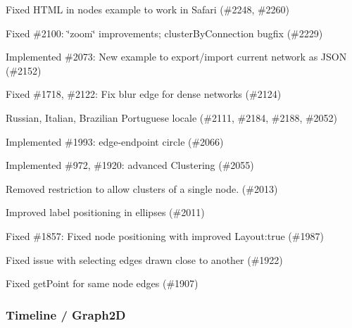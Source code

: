\begin{DoxyItemize}
\item Fixed H\+T\+ML in nodes example to work in Safari (\#2248, \#2260)
\item Fixed \#2100\+: \char`\"{}zoom\char`\"{} improvements; {\ttfamily cluster\+By\+Connection} bugfix (\#2229)
\item Implemented \#2073\+: New example to export/import current network as J\+S\+ON (\#2152)
\item Fixed \#1718, \#2122\+: Fix blur edge for dense networks (\#2124)
\item Russian, Italian, Brazilian Portuguese locale (\#2111, \#2184, \#2188, \#2052)
\item Implemented \#1993\+: edge-\/endpoint \textquotesingle{}circle\textquotesingle{} (\#2066)
\item Implemented \#972, \#1920\+: advanced Clustering (\#2055)
\item Removed restriction to allow clusters of a single node. (\#2013)
\item Improved label positioning in ellipses (\#2011)
\item Fixed \#1857\+: Fixed node positioning with improved Layout\+:true (\#1987)
\item Fixed issue with selecting edges drawn close to another (\#1922)
\item Fixed get\+Point for same node edges (\#1907)
\end{DoxyItemize}

\subsubsection*{Timeline / Graph2D}


